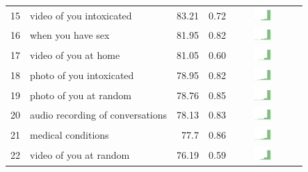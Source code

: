 \begin{table}[t]
\begin{center}
\begin{tabular}{| r | l | r | r | r | r |}
15 & video of you intoxicated & 83.21 & 0.72 & \includegraphics[width = 2cm, height = 0.5cm]{tex-inputs/table-images/tookavideoofyouintoxicatedcombined} \\ 
16 & when you have sex & 81.95 & 0.82 & \includegraphics[width = 2cm, height = 0.5cm]{tex-inputs/table-images/learnedwhenandhowmuchyouhavesexcombined} \\ 
17 & video of you at home & 81.05 & 0.60 & \includegraphics[width = 2cm, height = 0.5cm]{tex-inputs/table-images/tookvideosofyou(withaninward-facingcamera)athomecombined} \\ 
18 & photo of you intoxicated & 78.95 & 0.82 &  \includegraphics[width = 2cm, height = 0.5cm]{tex-inputs/table-images/tookaphotoofyouintoxicatedcombined} \\ 
19 & photo of you at random & 78.76 & 0.85 & \includegraphics[width = 2cm, height = 0.5cm]{tex-inputs/table-images/tookphotosofyou(withaninward-facingcamera)atrandomcombined} \\ 
20 & audio recording of conversations & 78.13 & 0.83 & \includegraphics[width = 2cm, height = 0.5cm]{tex-inputs/table-images/recordedyourpassingconversationscombined} \\ 
21 & medical conditions & 77.7 & 0.86 &  \includegraphics[width = 2cm, height = 0.5cm]{tex-inputs/table-images/learnedwhatmedicalconditionsyouhavecombined} \\ 
22 & video of you at random & 76.19 & 0.59 & \includegraphics[width = 2cm, height = 0.5cm]{tex-inputs/table-images/tookvideosofyou(withaninward-facingcamera)atrandomcombined} \\ 

\end{tabular}
\end{center}
\end{table}
